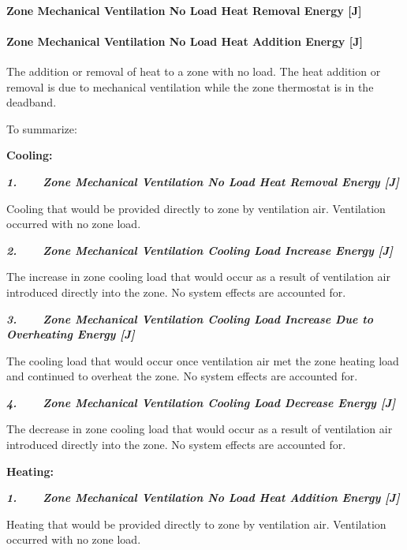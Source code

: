 \paragraph{Zone Mechanical Ventilation No Load Heat Removal Energy {[}J{]}}\label{zone-mechanical-ventilation-no-load-heat-removal-energy-j}

\paragraph{Zone Mechanical Ventilation No Load Heat Addition Energy {[}J{]}}\label{zone-mechanical-ventilation-no-load-heat-addition-energy-j}

The addition or removal of heat to a zone with no load. The heat addition or removal is due to mechanical ventilation while the zone thermostat is in the deadband.

To summarize:

\textbf{Cooling:}

\textbf{\emph{1.~~~~Zone Mechanical Ventilation No Load Heat Removal Energy {[}J{]}}}

Cooling that would be provided directly to zone by ventilation air. Ventilation occurred with no zone load.

\textbf{\emph{2.~~~~Zone Mechanical Ventilation Cooling Load Increase Energy {[}J{]}}}

The increase in zone cooling load that would occur as a result of ventilation air introduced directly into the zone. No system effects are accounted for.

\textbf{\emph{3.~~~~Zone Mechanical Ventilation Cooling Load Increase Due to Overheating Energy {[}J{]}}}

The cooling load that would occur once ventilation air met the zone heating load and continued to overheat the zone. No system effects are accounted for.

\textbf{\emph{4.~~~~Zone Mechanical Ventilation Cooling Load Decrease Energy {[}J{]}}}

The decrease in zone cooling load that would occur as a result of ventilation air introduced directly into the zone. No system effects are accounted for.

\textbf{Heating:}

\textbf{\emph{1.~~~~Zone Mechanical Ventilation No Load Heat Addition Energy {[}J{]}}}

Heating that would be provided directly to zone by ventilation air. Ventilation occurred with no zone load.

